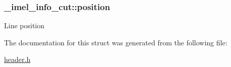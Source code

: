 \subsubsection[{\texorpdfstring{position}{position}}]{ \+\_\+imel\+\_\+info\+\_\+cut\+::position}\hypertarget{struct__imel__info__cut_a6690e6207a17f6407ec469699bc5d7d0}{}\label{struct__imel__info__cut_a6690e6207a17f6407ec469699bc5d7d0}
Line position 

The documentation for this struct was generated from the following file\+:\begin{DoxyCompactItemize}
\item 
\hyperlink{header_8h}{header.\+h}\end{DoxyCompactItemize}
